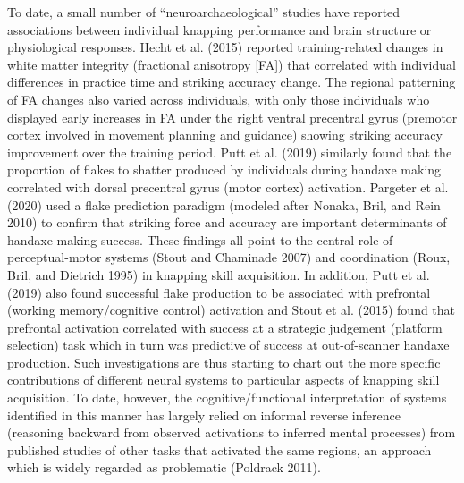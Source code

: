 \documentclass[smallextended]{svjour3}       %
\begin{document}
To date, a small number of ``neuroarchaeological'' studies have reported
associations between individual knapping performance and brain structure
or physiological responses. Hecht et al. (2015) reported
training-related changes in white matter integrity (fractional
anisotropy {[}FA{]}) that correlated with individual differences in
practice time and striking accuracy change. The regional patterning of
FA changes also varied across individuals, with only those individuals
who displayed early increases in FA under the right ventral precentral
gyrus (premotor cortex involved in movement planning and guidance)
showing striking accuracy improvement over the training period. Putt et
al. (2019) similarly found that the proportion of flakes to shatter
produced by individuals during handaxe making correlated with dorsal
precentral gyrus (motor cortex) activation. Pargeter et al. (2020) used
a flake prediction paradigm (modeled after Nonaka, Bril, and Rein 2010)
to confirm that striking force and accuracy are important determinants
of handaxe-making success. These findings all point to the central role
of perceptual-motor systems (Stout and Chaminade 2007) and coordination
(Roux, Bril, and Dietrich 1995) in knapping skill acquisition. In
addition, Putt et al. (2019) also found successful flake production to
be associated with prefrontal (working memory/cognitive control)
activation and Stout et al. (2015) found that prefrontal activation
correlated with success at a strategic judgement (platform selection)
task which in turn was predictive of success at out-of-scanner handaxe
production. Such investigations are thus starting to chart out the more
specific contributions of different neural systems to particular aspects
of knapping skill acquisition. To date, however, the
cognitive/functional interpretation of systems identified in this manner
has largely relied on informal reverse inference (reasoning backward
from observed activations to inferred mental processes) from published
studies of other tasks that activated the same regions, an approach
which is widely regarded as problematic (Poldrack 2011).
\end{document}
